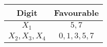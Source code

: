 
\begin{center}
    \begin{tabular}{|c|c|}
    \hline
	    \textbf{Digit}& \textbf{Favourable} \\ \hline
	    $X_{1}$ 		   & 	$5,7$	\\ \hline
	    $X_{2},X_{3},X_{4}$ 		   & 	${0,1,3,5,7}$ \\ \hline
    \end{tabular}
    \end{center}
